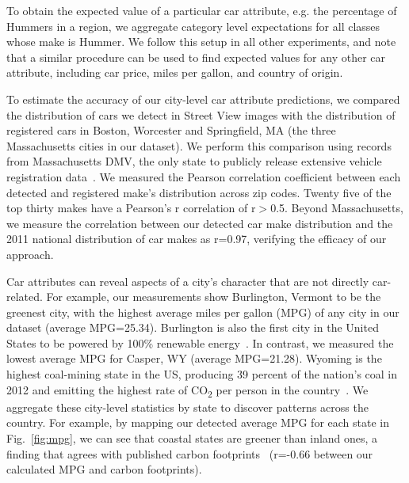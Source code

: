 \documentclass[letterpaper]{article}
\begin{document}
To obtain the expected value of a particular car attribute, e.g. the percentage of Hummers in a region, we aggregate category level expectations for all classes whose make is Hummer. We follow this setup in all other experiments, and note that a similar procedure can be used to find expected values for any other car attribute, including car price, miles per gallon, and country of origin.

To estimate the accuracy of our city-level car attribute predictions, we compared the distribution of cars we detect in Street View images with the distribution of registered cars in Boston, Worcester and Springfield, MA (the three Massachusetts cities in our dataset). We perform this comparison using records from Massachusetts DMV, the only state to publicly release extensive vehicle registration data~\cite{massgt}. We measured the Pearson correlation coefficient between each detected and registered make's distribution across zip codes. Twenty five of the top thirty makes have a Pearson's r correlation of r$>$0.5. Beyond Massachusetts, we measure the correlation between our detected car make distribution and the 2011 national distribution of car makes as r=0.97, verifying the efficacy of our approach. 

Car attributes can reveal aspects of a city's character that are not directly car-related. For example, our measurements show Burlington, Vermont to be the greenest city, with the highest average miles per gallon (MPG) of any city in our dataset (average MPG=25.34). Burlington is also the first city in the United States to be powered by 100\% renewable energy~\cite{burlington}. In contrast, we measured the lowest average MPG for Casper, WY (average MPG=21.28). Wyoming is the highest coal-mining state in the US, producing 39 percent of the nation's coal in 2012 and emitting the highest rate of CO\textsubscript{2} per person in the country~\cite{wyoming_coal}. We aggregate these city-level statistics by state to discover patterns across the country. For example, by mapping our detected average MPG for each state in Fig.~\ref{fig:mpg}, we can see that coastal states are greener than inland ones, a finding that agrees with published carbon footprints~\cite{state_ranking} (r=-0.66 between our calculated MPG and carbon footprints). 
\end{document}
